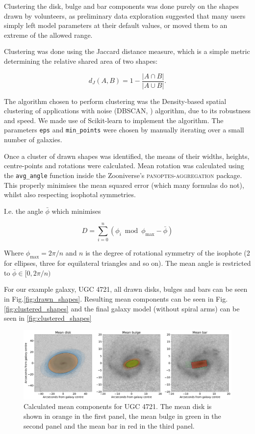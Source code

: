 \documentclass[../main.tex]{subfiles}
\begin{document}
Clustering the disk, bulge and bar components was done purely on the shapes drawn by volunteers, as preliminary data exploration suggested that many users simply left model parameters at their default values, or moved them to an extreme of the allowed range.

Clustering was done using the Jaccard distance measure, which is a simple metric determining the relative shared area of two shapes:

\begin{equation}
d_J(A, B) = 1 - \frac{|A \cap B|}{|A \cup B|}.
\end{equation}

The algorithm chosen to perform clustering was the Density-based spatial clustering of applications with noise (DBSCAN, \citealt{dbscan}) algorithm, due to its robustness and speed. We made use of Scikit-learn \cite{scikit-learn} to implement the algorithm. The parameters \texttt{eps} and \texttt{min\_points} were chosen by manually iterating over a small number of galaxies.

Once a cluster of drawn shapes was identified, the means of their widths, heights, centre-points and rotations were calculated. Mean rotation was calculated using the \texttt{avg\_angle} function inside the Zooniverse's \textsc{panoptes-aggregation} package. This properly minimises the mean squared error (which many formulas do not), whilst also respecting isophotal symmetries.

I.e. the angle $\bar{\phi}$ which minimises

\begin{equation}
    D = \sum_{i=0}^n \left(\phi_i \bmod \phi_\text{max} - \bar{\phi}\right)
\end{equation}

Where $\phi_\text{max} = 2\pi / n$ and $n$ is the degree of rotational symmetry of the isophote (2 for ellipses, three for equilateral triangles and so on). The mean angle is restricted to $\bar{\phi} \in [0, 2\pi / n)$

For our example galaxy, UGC 4721, all drawn disks, bulges and bars can be seen in Fig.\ref{fig:drawn_shapes}. Resulting mean components can be seen in Fig.\ref{fig:clustered_shapes} and the final galaxy model (without spiral arms) can be seen in \ref{fig:clustered_shapes}

\begin{figure}
  \includegraphics[width=15cm]{images__results/mean_shapes.pdf}
  \caption{Calculated mean components for UGC 4721. The mean disk is shown in orange in the first panel, the mean bulge in green in the second panel and the mean bar in red in the third panel.}
  \label{fig:mean_shapes}
\end{figure}
\end{document}
